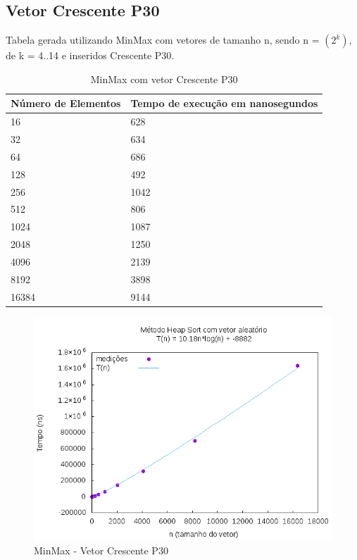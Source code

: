 \documentclass[12pt,a4paper,twoside]{report}
\begin{document}
\subsection{Vetor Crescente P30}
Tabela gerada utilizando MinMax com vetores de tamanho n, sendo n = $(2^k)$, de k = 4..14 e inseridos Crescente P30.
\begin{table}[H]
\centering
\caption{MinMax com vetor Crescente P30}
\label{my-label}
\begin{tabular}{|l|l|}
\hline
\multicolumn{1}{|c|}{\textbf{Número de Elementos}} & \multicolumn{1}{c|}{\textbf{Tempo de execução em nanosegundos}} \\ \hline
16 & 628 \\ \hline
32 & 634 \\ \hline
64 & 686 \\ \hline
128 & 492 \\ \hline
256 & 1042 \\ \hline
512 & 806 \\ \hline
1024 & 1087 \\ \hline
2048 & 1250 \\ \hline
4096 & 2139 \\ \hline
8192 & 3898 \\ \hline
16384 & 9144 \\ \hline
\end{tabular}
\end{table}

\begin{figure}[H]
    \centering
    \includegraphics[width=0.7\linewidth]{graficos/HeapSort/vIntAleatorio/vIntAleatorio.png}
  \caption{MinMax - Vetor Crescente P30}
\end{figure}
\end{document}
